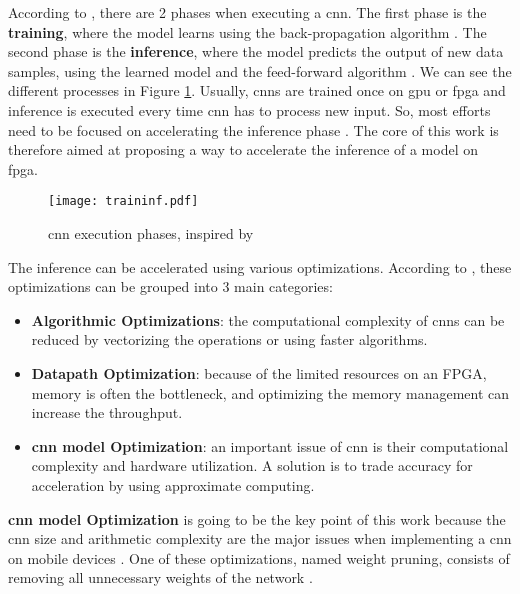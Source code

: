 According to \textcite{abdelouahab_accelerating_2018}, there are 2 phases when executing a \acrshort{cnn}. The first phase is the \textbf{training}, where the model learns using the back-propagation algorithm \cite{lecun_backpropagation_1989}. The second phase is the \textbf{inference}, where the model predicts the output of new data samples, using the learned model and the feed-forward algorithm \cite{zhang_optimizing_2015}. We can see the different processes in Figure \ref{fig:traininf}. Usually, \acrshort{cnn}s are trained once on \acrshort{gpu} or \acrshort{fpga} and inference is executed every time \acrshort{cnn} has to process new input. So, most efforts need to be focused on accelerating the inference phase \cite{abdelouahab_accelerating_2018}. The core of this work is therefore aimed at proposing a way to accelerate the inference of a model on \acrshort{fpga}.
%
\begin{figure}[H]
    \texttt{[image: traininf.pdf]}
    \caption{\acrshort{cnn} execution phases, inspired by \cite{nurvitadhi_can_2017}}
    \label{fig:traininf}
\end{figure}

The inference can be accelerated using various optimizations. According to \textcite{abdelouahab_accelerating_2018}, these optimizations can be grouped into 3 main categories:
\begin{itemize}
    \item \textbf{Algorithmic Optimizations}: the computational complexity of \acrshort{cnn}s can be reduced by vectorizing the operations or using faster algorithms.
    \item \textbf{Datapath Optimization}: because of the limited resources on an FPGA, memory is often the bottleneck, and optimizing the memory management can increase the throughput.
    \item \textbf{\acrshort{cnn} model Optimization}: an important issue of \acrshort{cnn} is their computational complexity and hardware utilization. A solution is to trade accuracy for acceleration by using approximate computing.
\end{itemize}

\textbf{\acrshort{cnn} model Optimization} is going to be the key point of this work because the \acrshort{cnn} size and arithmetic complexity are the major issues when implementing a \acrshort{cnn} on mobile devices \cite{cheng_recent_2018}. One of these optimizations, named weight pruning, consists of removing all unnecessary weights of the network \cite{abdelouahab_accelerating_2018}.

